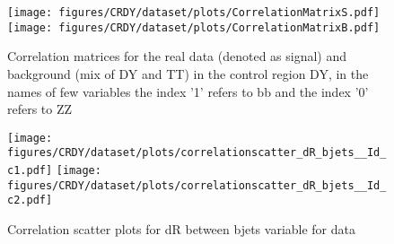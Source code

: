 \begin{figure}[!htb]%
\centering
\texttt{[image: figures/CRDY/dataset/plots/CorrelationMatrixS.pdf]}
\bigbreak
\texttt{[image: figures/CRDY/dataset/plots/CorrelationMatrixB.pdf]}
\caption{ Correlation matrices for the real data (denoted as signal) and background (mix of DY and TT) in the control region DY, in the names of few variables the index '1' refers to bb and the index '0' refers to ZZ}
\label{fig:corrMatrix_CRDY}                                                       
\end{figure}\clearpage





\begin{figure}[!htb]%
\centering
\texttt{[image: figures/CRDY/dataset/plots/correlationscatter\_dR\_bjets\_\_Id\_c1.pdf]}
\texttt{[image: figures/CRDY/dataset/plots/correlationscatter\_dR\_bjets\_\_Id\_c2.pdf]}
\caption{ Correlation scatter plots for dR between bjets variable for data}%
\label{fig:correlations_CRDY_drbjets_S}                                                       
\end{figure}\clearpage




